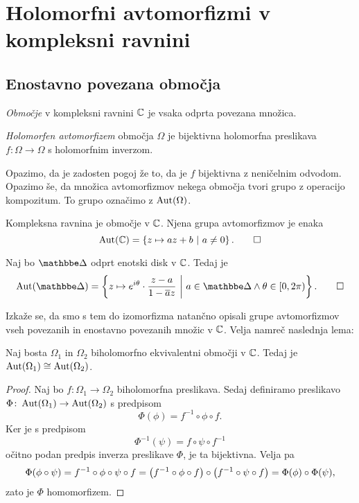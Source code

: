 \section{Holomorfni avtomorfizmi v kompleksni ravnini}

\subsection{Enostavno povezana območja}

\begin{definicija}
\emph{Območje} v kompleksni ravnini $\mathbb{C}$ je vsaka odprta povezana
množica.
\end{definicija}

\begin{definicija}
\emph{Holomorfen avtomorfizem} območja $\Omega$ je bijektivna
holomorfna preslikava $f \colon \Omega \to \Omega$ s holomorfnim
inverzom.
\end{definicija}

Opazimo, da je zadosten pogoj že to, da je $f$ bijektivna z
neničelnim odvodom. Opazimo še, da množica avtomorfizmov nekega
območja tvori grupo z operacijo kompozitum. To grupo označimo z
$\operatorname{Aut}(\Omega)$.

\begin{primer}
Kompleksna ravnina je območje v $\mathbb{C}$. Njena grupa avtomorfizmov
je enaka
\[
\operatorname{Aut}(\mathbb{C}) = \left\{z \mapsto az + b~\middle\vert~a \ne 0\right\}. \qedhere
\]
\end{primer}

\begin{primer}
Naj bo $\dsk$ odprt enotski disk v $\mathbb{C}$. Tedaj je
\[
\Aut(\dsk) =
\setb{z \mapsto e^{i \theta} \cdot \frac{z-a}{1 - \oline{a} z}}
{a \in \dsk \land \theta \in [0, 2\pi)}. \qedhere
\]
\end{primer}



Izkaže se, da smo s tem do izomorfizma natančno opisali grupe
avtomorfizmov vseh povezanih in enostavno povezanih množic v $\mathbb{C}$.
Velja namreč naslednja lema:

\begin{lema}
Naj bosta $\Omega_1$ in $\Omega_2$ biholomorfno ekvivalentni
območji v $\mathbb{C}$. Tedaj je $\operatorname{Aut}(\Omega_1) \cong \operatorname{Aut}(\Omega_2)$.
\end{lema}

\begin{proof}
Naj bo $f \colon \Omega_1 \to \Omega_2$ biholomorfna preslikava.
Sedaj definiramo preslikavo
$\Phi \colon \operatorname{Aut}(\Omega_1) \to \operatorname{Aut}(\Omega_2)$ s predpisom
\[
\Phi(\phi) = f^{-1} \circ \phi \circ f.
\]
Ker je s predpisom
\[
\Phi^{-1}(\psi) = f \circ \psi \circ f^{-1}
\]
očitno podan predpis inverza preslikave $\Phi$, je ta bijektivna.
Velja pa
\[
\Phi(\phi \circ \psi) = f^{-1} \circ \phi \circ \psi \circ f =
\left(f^{-1} \circ \phi \circ f\right) \circ
\left(f^{-1} \circ \psi \circ f\right) =
\Phi(\phi) \circ \Phi(\psi),
\]
zato je $\Phi$ homomorfizem.
\end{proof}

